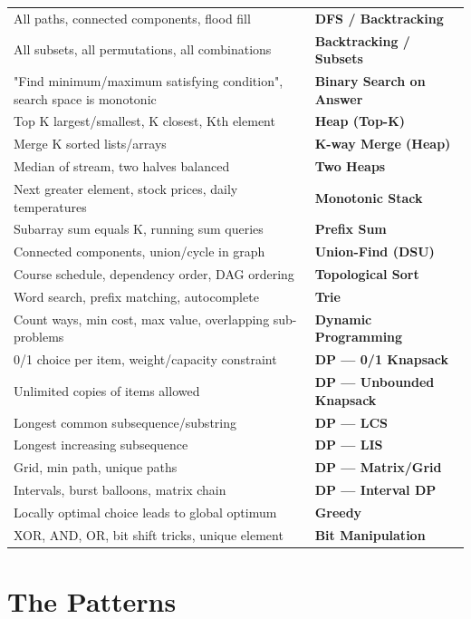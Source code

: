 \documentclass[11pt]{article}
\begin{document}
\begin{longtable}[]{@{}
  >{\raggedright\arraybackslash}p{}
  >{\raggedright\arraybackslash}p{}@{}}
\rowcolor{zebra}
All paths, connected components, flood fill & \textbf{DFS / Backtracking} \\
All subsets, all permutations, all combinations & \textbf{Backtracking / Subsets} \\
\rowcolor{zebra}
"Find minimum/maximum satisfying condition", search space is monotonic & \textbf{Binary Search on Answer} \\
Top K largest/smallest, K closest, Kth element & \textbf{Heap (Top-K)} \\
\rowcolor{zebra}
Merge K sorted lists/arrays & \textbf{K-way Merge (Heap)} \\
Median of stream, two halves balanced & \textbf{Two Heaps} \\
\rowcolor{zebra}
Next greater element, stock prices, daily temperatures & \textbf{Monotonic Stack} \\
Subarray sum equals K, running sum queries & \textbf{Prefix Sum} \\
\rowcolor{zebra}
Connected components, union/cycle in graph & \textbf{Union-Find (DSU)} \\
Course schedule, dependency order, DAG ordering & \textbf{Topological Sort} \\
\rowcolor{zebra}
Word search, prefix matching, autocomplete & \textbf{Trie} \\
Count ways, min cost, max value, overlapping sub-problems & \textbf{Dynamic Programming} \\
\rowcolor{zebra}
0/1 choice per item, weight/capacity constraint & \textbf{DP --- 0/1 Knapsack} \\
Unlimited copies of items allowed & \textbf{DP --- Unbounded Knapsack} \\
\rowcolor{zebra}
Longest common subsequence/substring & \textbf{DP --- LCS} \\
Longest increasing subsequence & \textbf{DP --- LIS} \\
\rowcolor{zebra}
Grid, min path, unique paths & \textbf{DP --- Matrix/Grid} \\
Intervals, burst balloons, matrix chain & \textbf{DP --- Interval DP} \\
\rowcolor{zebra}
Locally optimal choice leads to global optimum & \textbf{Greedy} \\
XOR, AND, OR, bit shift tricks, unique element & \textbf{Bit Manipulation} \\
\end{longtable}

\section{The Patterns}\label{the-patterns}
\end{document}
